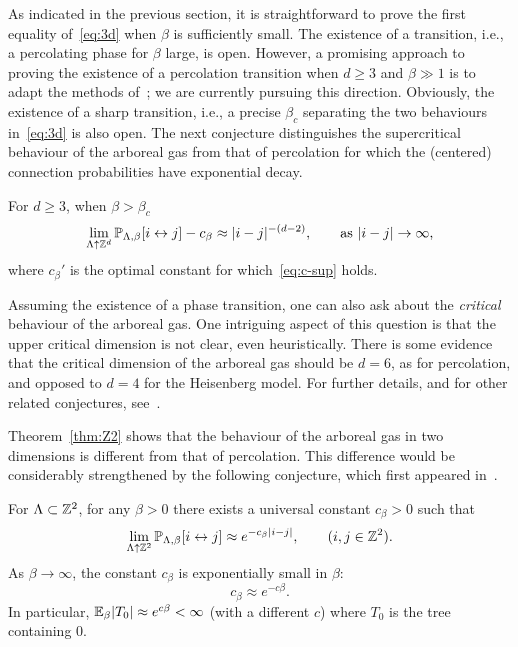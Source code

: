 \documentclass[11pt]{amsart}
\numberwithin{equation}{section}
\numberwithin{theorem}{section}
\begin{document}
As indicated in the previous section, it is straightforward to prove
the first equality of~\eqref{eq:3d} when $\beta$ is sufficiently
small.  The existence of a transition, i.e., a percolating phase for
$\beta$ large, is open.  However, a promising approach to proving the
existence of a percolation transition when $d\geq 3$ and $\beta\gg 1$
is to adapt the methods of~\cite{MR2728731}; we are currently pursuing
this direction. 
Obviously, the existence of a sharp transition, i.e., a precise
$\beta_{c}$ separating the two behaviours in~\eqref{eq:3d} is also open.
The next conjecture distinguishes the supercritical behaviour of
the arboreal gas from that of percolation for which the
  (centered) connection probabilities have exponential decay.
%
  \begin{conjecture}
    \label{con:Goldstone}
    For $d\geq 3$, when $\beta>\beta_{c}$ 
    \begin{equation}
      \label{eq:Goldstone}
      \lim_{\Lambda\uparrow \mathbb{Z}^{d}}\mathbb{P}_{\Lambda,\beta}[i\leftrightarrow j] - c_{\beta} \approx |i-j|^{-(d-2)},
      \qquad \text{as $|i-j|\to\infty$,}
    \end{equation}
    where $c_{\beta}'$ is the optimal constant for
    which~\eqref{eq:c-sup} holds.
  \end{conjecture}

Assuming the existence of a phase transition, one can also ask about
the \emph{critical} behaviour of the arboreal gas.  One intriguing
aspect of this question is that the upper critical dimension is not
clear, even heuristically.  There is some evidence that the critical dimension of the
arboreal gas should be $d=6$, as for percolation, and opposed to $d=4$
for the Heisenberg model.  For further details, and for other
related conjectures, see~\cite[Section~12]{MR3622573}.  

Theorem~\ref{thm:Z2} shows that the behaviour of the arboreal
gas in two dimensions
is different from that of percolation. This difference would be
considerably strengthened by the following conjecture, which
first appeared in~\cite{MR2110547}.

\begin{conjecture}
  \label{con:massgap}
 For $\Lambda\subset \mathbb{Z}^{2}$, for any $\beta>0$ there exists a
   universal constant $c_\beta>0$ such that
  \begin{equation}
    \lim_{\Lambda\uparrow \mathbb{Z}^{2}}\mathbb{P}_{\Lambda, \beta}[i\leftrightarrow j] \approx e^{-c_\beta|i-j|}, \qquad (i,j\in\mathbb{Z}^2).
  \end{equation}
  As $\beta \to \infty$, the constant $c_{\beta}$
  is exponentially small in $\beta$:
  \begin{equation}
    c_\beta \approx e^{-c\beta}.
  \end{equation}
  In particular, $\mathbb{E}_{\beta}|T_0| \approx e^{c\beta} < \infty$ (with a
  different $c$) where $T_0$ is the tree containing $0$. 
\end{conjecture}
\end{document}
